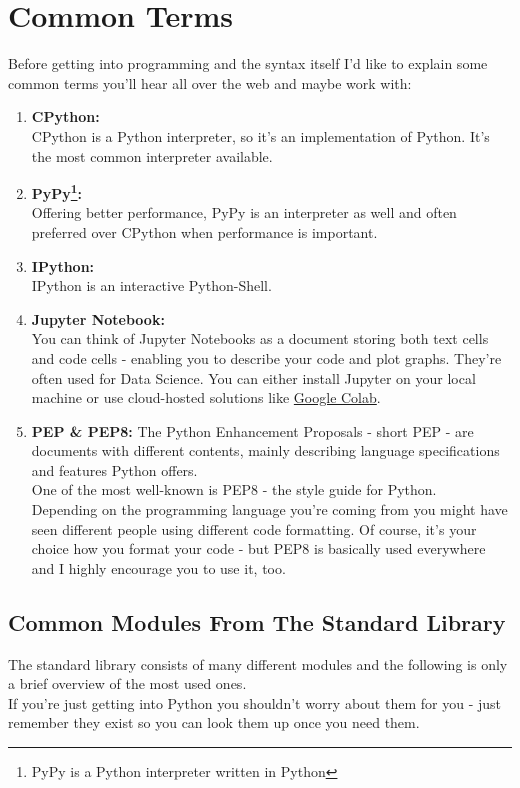 \section{Common Terms}
    Before getting into programming and the syntax itself I'd like to explain some common terms you'll hear all over the web and maybe work with:
    \begin{enumerate}
        \item \textbf{CPython:}\\
            CPython is a Python interpreter, so it's an implementation of Python.
            It's the most common interpreter available.
        \item \textbf{PyPy\footnote{PyPy is a Python interpreter written in Python}:}\\
            Offering better performance, PyPy is an interpreter as well and often preferred over CPython when performance is important.
        \item \textbf{IPython:}\\
            IPython is an interactive Python-Shell.
        \item \textbf{Jupyter Notebook:}\\
            You can think of Jupyter Notebooks as a document storing both text cells and code cells - enabling you to describe your code and plot graphs. They're often used for Data Science.
            You can either install Jupyter on your local machine or use cloud-hosted solutions like \href{https://colab.research.google.com/}{Google Colab}.
        \item \textbf{PEP \& PEP8:}
            The Python Enhancement Proposals - short PEP - are documents with different contents, mainly describing language specifications and features Python offers.\\
            One of the most well-known is PEP8 - the style guide for Python.\\
            Depending on the programming language you're coming from you might have seen different people using different code formatting.
            Of course, it's your choice how you format your code - but PEP8 is basically used everywhere and I highly encourage you to use it, too.
        \end{enumerate}
        
    \subsection{Common Modules From The Standard Library}
        The standard library consists of many different modules and the following is only a brief overview of the most used ones.\\
        If you're just getting into Python you shouldn't worry about them for you - just remember they exist so you can look them up once you need them.
        
